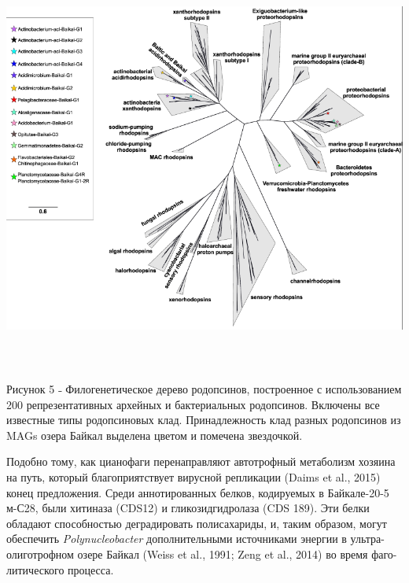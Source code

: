 \documentclass[a4paper,12pt,openany,final]{extreport}
\begin{document}
\includegraphics[width=6.46042in,height=5.26528in]{media/image10.png}

Рисунок 5 ˗ Филогенетическое дерево родопсинов, построенное с
использованием 200 репрезентативных архейных и бактериальных родопсинов.
Включены все известные типы родопсиновых клад. Принадлежность клад
разных родопсинов из MAGs озера Байкал выделена цветом и помечена
звездочкой.

Подобно тому, как цианофаги перенаправляют автотрофный метаболизм
хозяина на путь, который благоприятствует вирусной репликации (Daims et
al., 2015) конец предложения. Среди аннотированных белков, кодируемых в
Байкале-20-5 м-С28, были хитиназа (CDS12) и гликозидгидролаза (CDS 189).
Эти белки обладают способностью деградировать полисахариды, и, таким
образом, могут обеспечить \emph{Polynucleobacter} дополнительными
источниками энергии в ультра-олиготрофном озере Байкал (Weiss et al.,
1991; Zeng et al., 2014) во время фаго-литического процесса.
\end{document}
